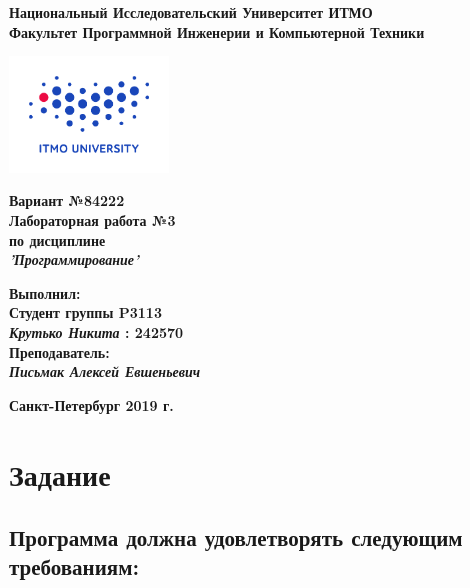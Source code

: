 \documentclass[11pt]{article}
\author{Krutko Nikita / KrutNA}
\date{\today}
\title{}
\begin{document}
\large
\thispagestyle{empty}
\begin{center}
\textbf{Национальный Исследовательский Университет ИТМО}\\
\textbf{Факультет Программной Инженерии и Компьютерной Техники}\\
\end{center}
\vspace{2em}
\begin{center}
\includegraphics[width=120pt]{itmo-logo.png}
\end{center}
\LARGE
\vspace{5em}
\begin{center}
\textbf{Вариант №84222}\\
\textbf{Лабораторная работа №3}\\
\Large
\textbf{по дисциплине}\\
\LARGE
\textbf{\emph{'Программирование'}}\\
\end{center}
\vspace{11em}
\large
\begin{flushright}
\textbf{Выполнил:}\\
\textbf{Студент группы P3113}\\
\textbf{\emph{Крутько Никита} : 242570}\\
\textbf{Преподаватель:}\\
\textbf{\emph{Письмак Алексей Евшеньевич}}\\
\end{flushright}
\vspace{4em}
\large
\begin{center}
\textbf{Санкт-Петербург 2019 г.}
\end{center}
\pagebreak{}
\setcounter{tocdepth}{2}
\tableofcontents
\vspace{2em}
\section{Задание}
\label{sec:org6ef992b}

\subsection{Программа должна удовлетворять следующим требованиям:}
\label{sec:org0949cc2}
\end{document}
